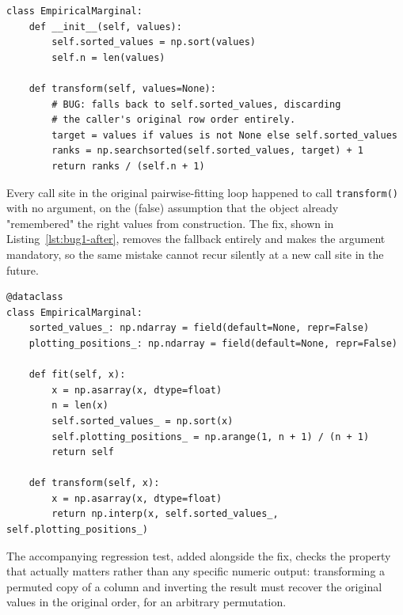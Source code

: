 \documentclass[
  english,
  class=report,
  accentcolor=2c,
  marginpar=false,
  parskip=half-,
  fontsize=11pt,
  ruledheaders=false,
  pdfa=false,
  IMRAD=false,
  thesis={type=master}
]{tudapub}
\begin{document}
\begin{lstlisting}[caption={Before (simplified reconstruction for illustration; the buggy version is documented in the lab notebook but was not preserved in the repository history): silently returns pseudo-observations in sorted, not original, row order when called without an explicit argument.}, label={lst:bug1-before}]
class EmpiricalMarginal:
    def __init__(self, values):
        self.sorted_values = np.sort(values)
        self.n = len(values)

    def transform(self, values=None):
        # BUG: falls back to self.sorted_values, discarding
        # the caller's original row order entirely.
        target = values if values is not None else self.sorted_values
        ranks = np.searchsorted(self.sorted_values, target) + 1
        return ranks / (self.n + 1)
\end{lstlisting}

Every call site in the original pairwise-fitting loop happened to call
\texttt{transform()} with no argument, on the (false) assumption that the
object already "remembered" the right values from construction. The fix,
shown in Listing~\ref{lst:bug1-after}, removes the fallback entirely and
makes the argument mandatory, so the same mistake cannot recur silently at
a new call site in the future.

\begin{lstlisting}[caption={After (verbatim from \texttt{gcda/data/preprocessing.py}, docstrings shortened): \texttt{transform} has no default argument, so every caller must pass the values, in the order it wants them transformed.}, label={lst:bug1-after}]
@dataclass
class EmpiricalMarginal:
    sorted_values_: np.ndarray = field(default=None, repr=False)
    plotting_positions_: np.ndarray = field(default=None, repr=False)

    def fit(self, x):
        x = np.asarray(x, dtype=float)
        n = len(x)
        self.sorted_values_ = np.sort(x)
        self.plotting_positions_ = np.arange(1, n + 1) / (n + 1)
        return self

    def transform(self, x):
        x = np.asarray(x, dtype=float)
        return np.interp(x, self.sorted_values_, self.plotting_positions_)
\end{lstlisting}

The accompanying regression test, added alongside the fix, checks the
property that actually matters rather than any specific numeric output:
transforming a permuted copy of a column and inverting the result must
recover the original values in the original order, for an arbitrary
permutation.
\end{document}
